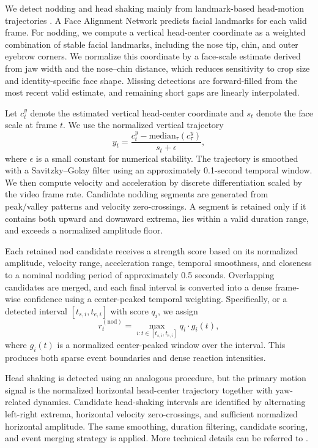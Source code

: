 We detect nodding and head shaking mainly from landmark-based head-motion trajectories \cite{lugaresi2019mediapipe}. A Face Alignment Network predicts facial landmarks for each valid frame. For nodding, we compute a vertical head-center coordinate as a weighted combination of stable facial landmarks, including the nose tip, chin, and outer eyebrow corners. We normalize this coordinate by a face-scale estimate derived from jaw width and the nose--chin distance, which reduces sensitivity to crop size and identity-specific face shape. Missing detections are forward-filled from the most recent valid estimate, and remaining short gaps are linearly interpolated.

Let $c^y_t$ denote the estimated vertical head-center coordinate and $s_t$ denote the face scale at frame $t$. We use the normalized vertical trajectory
\begin{equation}
    y_t = \frac{c^y_t - \mathrm{median}_{\tau}(c^y_{\tau})}{s_t+\epsilon},
\end{equation}
where $\epsilon$ is a small constant for numerical stability. The trajectory is smoothed with a Savitzky--Golay filter using an approximately 0.1-second temporal window. We then compute velocity and acceleration by discrete differentiation scaled by the video frame rate. Candidate nodding segments are generated from peak/valley patterns and velocity zero-crossings. A segment is retained only if it contains both upward and downward extrema, lies within a valid duration range, and exceeds a normalized amplitude floor.

Each retained nod candidate receives a strength score based on its normalized amplitude, velocity range, acceleration range, temporal smoothness, and closeness to a nominal nodding period of approximately 0.5 seconds. Overlapping candidates are merged, and each final interval is converted into a dense frame-wise confidence using a center-peaked temporal weighting. Specifically, or a detected interval $[t_{s,i},t_{e,i}]$ with score $q_i$, we assign
\begin{equation}
    r^{(\mathrm{nod})}_t = \max_{i:t\in[t_{s,i},t_{e,i}]} q_i \cdot g_i(t),
\end{equation}
where $g_i(t)$ is a normalized center-peaked window over the interval. This produces both sparse event boundaries and dense reaction intensities.

Head shaking is detected using an analogous procedure, but the primary motion signal is the normalized horizontal head-center trajectory together with yaw-related dynamics. Candidate head-shaking intervals are identified by alternating left-right extrema, horizontal velocity zero-crossings, and sufficient normalized horizontal amplitude. The same smoothing, duration filtering, candidate scoring, and event merging strategy is applied. More technical details can be referred to \cite{lugaresi2019mediapipe}.

